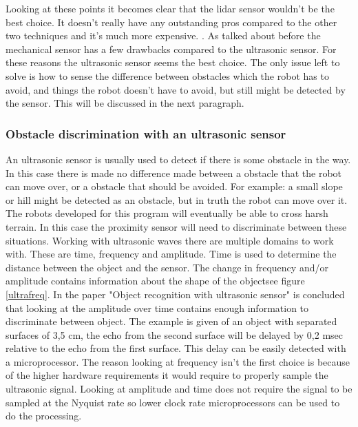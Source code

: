 \documentclass[10pt,a4paper]{article}
\begin{document}
Looking at these points it becomes clear that the lidar sensor wouldn't be the best choice. It doesn't really have any outstanding pros compared to the other two techniques and it's much more expensive. . As talked about before the mechanical sensor has a few drawbacks compared to the ultrasonic sensor. For these reasons the ultrasonic sensor seems the best choice. The only issue left to solve is how to sense the difference between obstacles which the robot has to avoid, and things the robot doesn't have to avoid, but still might be detected by the sensor. This will be discussed in the next paragraph.

\subsubsection{Obstacle discrimination with an ultrasonic sensor}
An ultrasonic sensor is usually used to detect if there is some obstacle in the way. In this case there is made no difference made between a obstacle that the robot can move over, or a obstacle that should be avoided. For example: a small slope or hill might be detected as an obstacle, but in truth the robot can move over it. The robots developed for this program will eventually be able to cross harsh terrain. In this case the proximity sensor will need to discriminate between these situations. Working with ultrasonic waves there are multiple domains to work with. These are time, frequency and amplitude. Time is used to determine the distance between the object and the sensor. The change in frequency and/or amplitude contains information about the shape of the object\cite{ultraobject}see figure \ref{ultrafreq}. In the paper "Object recognition with ultrasonic sensor" is concluded that looking at the amplitude over time contains enough information to discriminate between object\cite{ultraobject}. The example is given of an object with separated surfaces of 3,5 cm, the echo from the second surface will be delayed by 0,2 msec relative to the echo from the first surface. This delay can be easily detected with a microprocessor. The reason looking at frequency isn't the first choice is because of the higher hardware requirements it would require to properly sample the ultrasonic signal. Looking at amplitude and time does not require the signal to be sampled at the Nyquist rate so lower clock rate microprocessors can be used to do the processing.
\\
\end{document}
